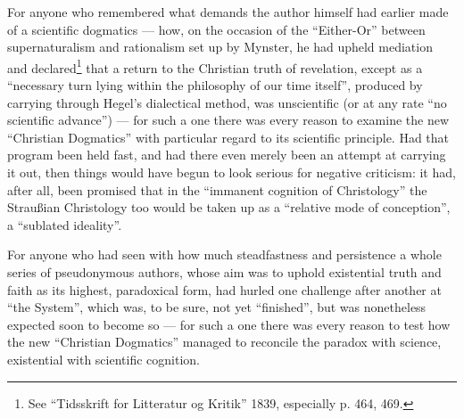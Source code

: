 \documentclass[12pt,a4paper]{book}
\newcommand{\opage}[1]{\marginnote{\footnotesize\textit{[#1]}}}
\begin{document}
For anyone who remembered what demands the author himself had earlier made of a scientific dogmatics --- how, on the occasion of the ``Either-Or'' between supernaturalism and rationalism set up by Mynster, he had upheld mediation and declared\footnote{See ``Tidsskrift for Litteratur og Kritik'' 1839, especially p. 464, 469.} that a return to the Christian truth of revelation, except as a ``necessary turn lying within the philosophy of our time itself'', produced by carrying through Hegel's dialectical method, was unscientific (or at any rate ``no scientific advance'') --- for such a one there was every reason to examine the new ``Christian Dogmatics'' with particular regard to its scientific principle. Had that program been held fast, and had there even merely been an attempt at carrying it out, then things would have begun to look serious for negative criticism: it had, after all, been promised that in the ``immanent cognition of Christology'' the Straußian Christology too would be taken up as a ``relative mode of conception'', a ``sublated ideality''.

For anyone who had seen with how much steadfastness and persistence a whole series of pseudonymous authors, whose aim was to uphold existential truth and faith as its highest, paradoxical form, had hurled one challenge after another at ``the System'', which was, to be sure, not yet ``finished'', but was nonetheless expected soon to become so --- for such a one there was every reason to test how
\opage{26}\setcounter{footnote}{0}%
the new ``Christian Dogmatics'' managed to reconcile the paradox with science, existential with scientific cognition.
\end{document}
